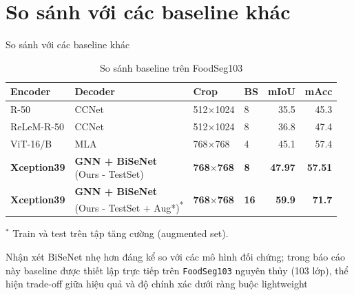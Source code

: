 \section{So sánh với các baseline khác}

\begin{frame}{So sánh với các baseline khác}
  \begin{table}
    \small
    \setlength{\tabcolsep}{4pt}
    \begin{tabular}{llllrr}
      \toprule
      \textbf{Encoder} & \textbf{Decoder} & \textbf{Crop} & \textbf{BS} & \textbf{mIoU} & \textbf{mAcc} \\
      \midrule
      R-50       & CCNet & 512$\times$1024 & 8 & 35.5 & 45.3 \\
      ReLeM-R-50 & CCNet & 512$\times$1024 & 8 & 36.8 & 47.4 \\
      ViT-16/B   & MLA   & 768$\times$768  & 4 & 45.1 & 57.4 \\
      \midrule
      \textbf{Xception39} & \shortstack[l]{\textbf{GNN + BiSeNet}\\(Ours - TestSet)} & \textbf{768$\times$768} & \textbf{8} & \textbf{47.97} & \textbf{57.51} \\
      \textbf{Xception39} & \shortstack[l]{\textbf{GNN + BiSeNet}\\(Ours - TestSet + Aug*)}\textsuperscript{*} & \textbf{768$\times$768} & \textbf{16} & \textbf{59.9} & \textbf{71.7} \\
      \bottomrule
    \end{tabular}
    \caption{So sánh baseline trên FoodSeg103}
  \end{table}
  \vspace{-0.4em}
  {\tiny $^\ast$ Train và test trên tập tăng cường (augmented set).}
  \vspace{0.3em}
  \begin{block}{Nhận xét}
    BiSeNet nhẹ hơn đáng kể so với các mô hình đối chứng; trong báo cáo này baseline được thiết lập trực tiếp trên \texttt{FoodSeg103} nguyên thủy (103 lớp), thể hiện trade-off giữa hiệu quả và độ chính xác dưới ràng buộc lightweight
  \end{block}
\end{frame}

